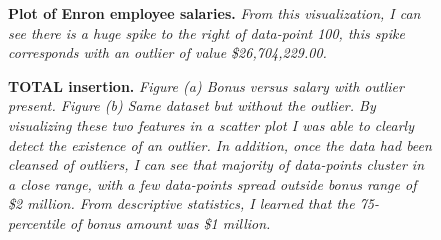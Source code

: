 \documentclass[titlepage,numbers=noenddot,headinclude,%
               footinclude=true,abstractoff,BCOR=5mm,%
               paper=a4,fontsize=11pt,ngerman,american]{scrreprt}
\numberwithin{theorem}{chapter}
\numberwithin{definition}{chapter}
\numberwithin{algorithm}{chapter}
\numberwithin{figure}{chapter}
\numberwithin{table}{chapter}
\numberwithin{equation}{chapter}
\begin{document}
\begin{figure}[!hbtp]
\centering

    \caption{\textbf{Plot of Enron employee salaries.}\textit{ From this visualization, I can see there is a huge spike to the right of data-point 100, this spike corresponds with an outlier of value \$26,704,229.00.}}
\end{figure}

\begin{figure}[!hbtp]
\centering

    \caption{\textbf{TOTAL insertion.} \textit{Figure (a) Bonus versus salary with outlier present. Figure (b) Same dataset but without the outlier. By visualizing these two features in a scatter plot I was able to clearly detect the existence of an outlier. In addition, once the data had been cleansed of outliers, I can see that majority of data-points cluster in a close range, with a few data-points spread outside bonus range of \$2 million. From descriptive statistics, I learned that the 75-percentile of bonus amount was \$1 million. }}
\end{figure}
\end{document}
